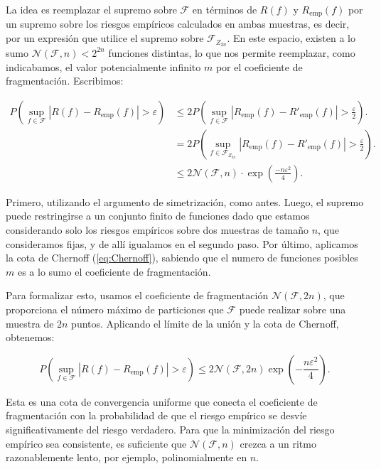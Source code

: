 \documentclass{report}
\begin{document}
La idea es reemplazar el supremo sobre \(\mathcal{F}\) en términos de \(R(f)\) y 
\(R_{\text{emp}}(f)\) por un supremo sobre los riesgos empíricos calculados en ambas muestras, es decir, por un expresión
que utilice el supremo sobre \(\mathcal{F}_{Z_{2n}}\). En este espacio, existen a lo sumo $\mathcal{N}(\mathcal{F}, n)<2^{2n}$
funciones distintas, lo que nos permite reemplazar, como indicabamos, el valor potencialmente infinito $m$ por el coeficiente de 
fragmentación. Escribimos:\newline

\[
\begin{aligned}
P\left(\sup_{f \in \mathcal{F}} |R(f) - R_{\text{emp}}(f)| > \varepsilon\right) &\leq 
2P\left(\sup_{f \in \mathcal{F}} |R_{\text{emp}}(f) - R'_{\text{emp}}(f)| > \frac{\varepsilon}{2}\right).\\
& = 2P\left(\sup_{f \in \mathcal{F}_{Z_{2n}}} |R_{\text{emp}}(f) - R'_{\text{emp}}(f)| > \frac{\varepsilon}{2}\right).\\
& \leq 2  \mathcal{N}(\mathcal{F}, n)\cdot \exp\left(\frac{-n\varepsilon^2}{4}\right).
\end{aligned}
\]

Primero, utilizando el argumento de simetrización, como antes. Luego, el supremo puede restringirse a un conjunto finito de funciones
dado que estamos considerando solo los riesgos empíricos sobre dos muestras de tamaño $n$, que consideramos fijas, y de allí igualamos
en el segundo paso. Por último, aplicamos la cota de Chernoff (\ref{eq:Chernoff}), sabiendo que el numero de funciones
posibles $m$ es a lo sumo el coeficiente de fragmentación.\newline

Para formalizar esto, usamos el coeficiente de fragmentación \(\mathcal{N}(\mathcal{F}, 2n)\), que proporciona el número máximo 
de particiones que \(\mathcal{F}\) puede realizar sobre una muestra de \(2n\) puntos. Aplicando el límite de la unión 
y la cota de Chernoff, obtenemos:

\begin{equation} 
    P\left(\sup_{f \in \mathcal{F}} |R(f) - R_{\text{emp}}(f)| > \varepsilon \right) \leq 
    2\mathcal{N}(\mathcal{F}, 2n) \exp\left(-\frac{n\varepsilon^2}{4}\right). \label{eq: cota convergencia coeficiente fragmentacion}
\end{equation}

Esta es una cota de convergencia uniforme que conecta el coeficiente de fragmentación con la probabilidad de 
que el riesgo empírico se desvíe significativamente del riesgo verdadero. Para que la minimización del riesgo 
empírico sea consistente, es suficiente que $\mathcal{N}(\mathcal{F}, n)$ crezca a un ritmo razonablemente lento, por ejemplo, 
polinomialmente en \(n\).\newline
\end{document}
